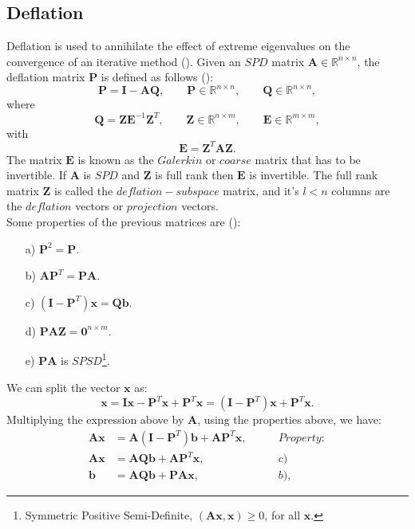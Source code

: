 \documentclass[12pt]{article}
\begin{document}
\subsection{Deflation}\label{def}
\hspace{0.5cm}Deflation is used to annihilate the effect of extreme eigenvalues on the convergence of an iterative method (\cite{Vuik99}). 
Given an $SPD$ matrix $\mathbf{A} \in \mathbb{R}^{n \times n}$, the deflation matrix $\mathbf{P}$ is defined as follows (\cite{Tang08}):
$$\mathbf{P}=\mathbf{I}-\mathbf{A}\mathbf{Q}, \qquad \mathbf{P} \in \mathbb{R}^{n \times n}, \qquad \mathbf{Q} \in \mathbb{R}^{n \times n},$$
where
$$\mathbf{Q}=\mathbf{Z}\mathbf{E}^{-1}\mathbf{Z}^T, \qquad \mathbf{Z} \in \mathbb{R}^{n \times m}, \qquad \mathbf{E} \in \mathbb{R}^{m \times m}, $$
with
$$\mathbf{E}=\mathbf{Z}^T\mathbf{A}\mathbf{Z}.$$
The matrix $\mathbf{E}$ is known as the $Galerkin$ or $coarse$ matrix that has to be invertible. 
If $\mathbf{A}$ is $SPD$ and $\mathbf{Z}$ is full rank then $\mathbf{E}$ is invertible. 
The full rank matrix $\mathbf{Z}$ is called the $deflation-subspace$ matrix, 
and it's $l<n$ columns are the
$deflation$ vectors or $projection$ vectors.\\
Some properties of the previous matrices are (\cite[pag. 27]{Tang08}):
\begin{enumerate}\label{defprop}
 \item[a)] $\mathbf{P}^2=\mathbf{P}.$
 \item[b)] $\mathbf{A}\mathbf{P}^T=\mathbf{P}\mathbf{A}.$
 \item[c)] $(\mathbf{I}-\mathbf{P}^T)\mathbf{x}=\mathbf{Q}\mathbf{b}.$
 \item[d)] $\mathbf{P}\mathbf{A}\mathbf{Z}=\mathbf{0}^{n\times m}.$
 \item[e)] $\mathbf{P}\mathbf{A}$ is $SPSD$\footnote{Symmetric Positive Semi-Definite, $(\mathbf{A}\mathbf{x},\mathbf{x})\geq 0$, for all $\mathbf{x}$.}.
\end{enumerate}
We can split the vector $\mathbf{x}$ as:
\begin{equation}\label{eq:splx}
    \mathbf{x}=\mathbf{I}\mathbf{x}-\mathbf{P}^T\mathbf{x}+\mathbf{P}^T\mathbf{x}=(\mathbf{I}-\mathbf{P}^T)\mathbf{x}+\mathbf{P}^T\mathbf{x}.
\end{equation}
Multiplying the expression above by $\mathbf{A}$, using the properties above, we have:
\begin{align*}
\mathbf{A}\mathbf{x}&=\mathbf{A}(\mathbf{I}-\mathbf{P}^T)\mathbf{b}+\mathbf{A}\mathbf{P}^T\mathbf{x},\qquad&Property:\\
\mathbf{A}\mathbf{x}&=\mathbf{A}\mathbf{Q}\mathbf{b}+\mathbf{A}\mathbf{P}^T\mathbf{x},&c)\\
\mathbf{b}&=\mathbf{A}\mathbf{Q}\mathbf{b}+\mathbf{P}\mathbf{A}\mathbf{x},&b),
\end{align*}
\end{document}
